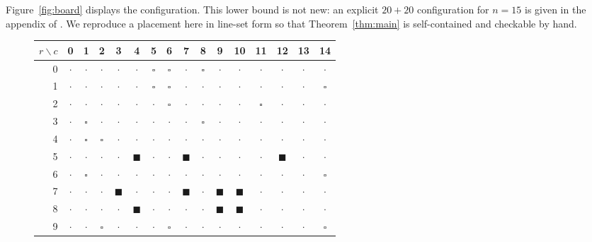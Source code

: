 \documentclass[11pt]{amsart}
\theoremstyle{remark}
\begin{document}
Figure~\ref{fig:board} displays the configuration. This lower bound is not new: an explicit $20+20$ configuration for $n=15$ is given in the appendix of \cite{CDHS24}. We reproduce a placement here in line-set form so that Theorem~\ref{thm:main} is self-contained and checkable by hand.

\begin{figure}[t]
\centering
\setlength{\tabcolsep}{2.4pt}
\renewcommand{\arraystretch}{1.05}
{\small
\begin{tabular}{r|*{15}{c}}
$r\backslash c$ & 0 & 1 & 2 & 3 & 4 & 5 & 6 & 7 & 8 & 9 & 10 & 11 & 12 & 13 & 14 \\
\midrule
0 & $\cdot$ & $\cdot$ & $\cdot$ & $\cdot$ & $\cdot$ & $\square$ & $\square$ & $\cdot$ & $\square$ & $\cdot$ & $\cdot$ & $\cdot$ & $\cdot$ & $\cdot$ & $\cdot$ \\
1 & $\cdot$ & $\cdot$ & $\cdot$ & $\cdot$ & $\cdot$ & $\square$ & $\square$ & $\cdot$ & $\cdot$ & $\cdot$ & $\cdot$ & $\cdot$ & $\cdot$ & $\cdot$ & $\square$ \\
2 & $\cdot$ & $\cdot$ & $\cdot$ & $\cdot$ & $\cdot$ & $\cdot$ & $\square$ & $\cdot$ & $\cdot$ & $\cdot$ & $\cdot$ & $\square$ & $\cdot$ & $\cdot$ & $\cdot$ \\
3 & $\cdot$ & $\square$ & $\cdot$ & $\cdot$ & $\cdot$ & $\cdot$ & $\cdot$ & $\cdot$ & $\square$ & $\cdot$ & $\cdot$ & $\cdot$ & $\cdot$ & $\cdot$ & $\cdot$ \\
4 & $\cdot$ & $\square$ & $\square$ & $\cdot$ & $\cdot$ & $\cdot$ & $\cdot$ & $\cdot$ & $\cdot$ & $\cdot$ & $\cdot$ & $\cdot$ & $\cdot$ & $\cdot$ & $\cdot$ \\
5 & $\cdot$ & $\cdot$ & $\cdot$ & $\cdot$ & $\blacksquare$ & $\cdot$ & $\cdot$ & $\blacksquare$ & $\cdot$ & $\cdot$ & $\cdot$ & $\cdot$ & $\blacksquare$ & $\cdot$ & $\cdot$ \\
6 & $\cdot$ & $\square$ & $\cdot$ & $\cdot$ & $\cdot$ & $\cdot$ & $\cdot$ & $\cdot$ & $\cdot$ & $\cdot$ & $\cdot$ & $\cdot$ & $\cdot$ & $\cdot$ & $\square$ \\
7 & $\cdot$ & $\cdot$ & $\cdot$ & $\blacksquare$ & $\cdot$ & $\cdot$ & $\cdot$ & $\blacksquare$ & $\cdot$ & $\blacksquare$ & $\blacksquare$ & $\cdot$ & $\cdot$ & $\cdot$ & $\cdot$ \\
8 & $\cdot$ & $\cdot$ & $\cdot$ & $\cdot$ & $\blacksquare$ & $\cdot$ & $\cdot$ & $\cdot$ & $\cdot$ & $\blacksquare$ & $\blacksquare$ & $\cdot$ & $\cdot$ & $\cdot$ & $\cdot$ \\
9 & $\cdot$ & $\cdot$ & $\square$ & $\cdot$ & $\cdot$ & $\cdot$ & $\square$ & $\cdot$ & $\cdot$ & $\cdot$ & $\cdot$ & $\cdot$ & $\cdot$ & $\cdot$ & $\square$ \\

\end{tabular}}
\end{figure}
\end{document}
